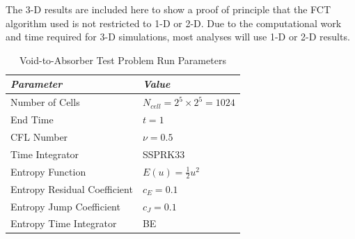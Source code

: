 The 3-D results are included here to show a proof of principle
that the FCT algorithm used is not restricted to 1-D or 2-D.
Due to the computational work and time required for 3-D simulations,
most analyses will use 1-D or 2-D results.
\begin{table}[h]\caption{Void-to-Absorber Test Problem Run Parameters}
\label{tab:void_to_absorber_run_parameters}
\centering
\begin{tabular}{l l}\toprule
\emph{Parameter} & \emph{Value}\\\midrule
Number of Cells & $N_{cell} = 2^5 \times 2^5 = 1024$\\
End Time & $t = 1$\\
CFL Number & $\nu = 0.5$\\
Time Integrator & SSPRK33\\\midrule
Entropy Function & $E(u) = \frac{1}{2}u^2$\\
Entropy Residual Coefficient & $c_E = 0.1$\\
Entropy Jump Coefficient & $c_J = 0.1$\\
Entropy Time Integrator & BE\\
\bottomrule\end{tabular}
\end{table}
